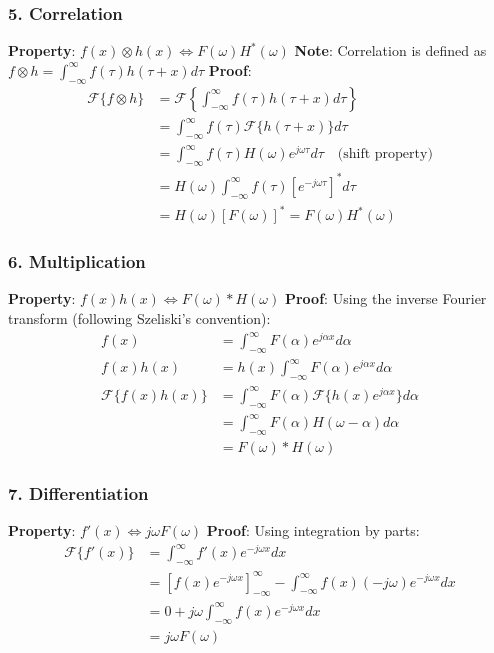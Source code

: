 \documentclass[12pt,a4paper]{article}
\begin{document}
\subsubsection*{5. Correlation}
\textbf{Property}: $f(x) \otimes h(x) \Leftrightarrow F(\omega)H^*(\omega)$
\newline
\textbf{Note}: Correlation is defined as $f \otimes h = \int_{-\infty}^{\infty} f(\tau)h(\tau + x)d\tau$
\newline
\textbf{Proof}:
\begin{align*}
\mathcal{F}\{f \otimes h\} &= \mathcal{F}\left\{\int_{-\infty}^{\infty} f(\tau)h(\tau + x)d\tau\right\}\\
&= \int_{-\infty}^{\infty} f(\tau)\mathcal{F}\{h(\tau + x)\}d\tau\\
&= \int_{-\infty}^{\infty} f(\tau)H(\omega)e^{j\omega \tau}d\tau \quad \text{(shift property)}\\
&= H(\omega)\int_{-\infty}^{\infty} f(\tau)[e^{-j\omega \tau}]^*d\tau\\
&= H(\omega)[F(\omega)]^* = F(\omega)H^*(\omega)
\end{align*}

\subsubsection*{6. Multiplication}
\textbf{Property}: $f(x)h(x) \Leftrightarrow F(\omega) * H(\omega)$
\newline
\textbf{Proof}: Using the inverse Fourier transform (following Szeliski's convention):
\begin{align*}
f(x) &= \int_{-\infty}^{\infty} F(\alpha)e^{j\alpha x}d\alpha\\
f(x)h(x) &= h(x) \int_{-\infty}^{\infty} F(\alpha)e^{j\alpha x}d\alpha\\
\mathcal{F}\{f(x)h(x)\} &= \int_{-\infty}^{\infty} F(\alpha)\mathcal{F}\{h(x)e^{j\alpha x}\}d\alpha\\
&= \int_{-\infty}^{\infty} F(\alpha)H(\omega - \alpha)d\alpha\\
&= F(\omega) * H(\omega)
\end{align*}

\subsubsection*{7. Differentiation}
\textbf{Property}: $f'(x) \Leftrightarrow j\omega F(\omega)$
\newline
\textbf{Proof}: Using integration by parts:
\begin{align*}
\mathcal{F}\{f'(x)\} &= \int_{-\infty}^{\infty} f'(x)e^{-j\omega x}dx\\
&= [f(x)e^{-j\omega x}]_{-\infty}^{\infty} - \int_{-\infty}^{\infty} f(x)(-j\omega)e^{-j\omega x}dx\\
&= 0 + j\omega\int_{-\infty}^{\infty} f(x)e^{-j\omega x}dx\\
&= j\omega F(\omega)
\end{align*}
\end{document}
